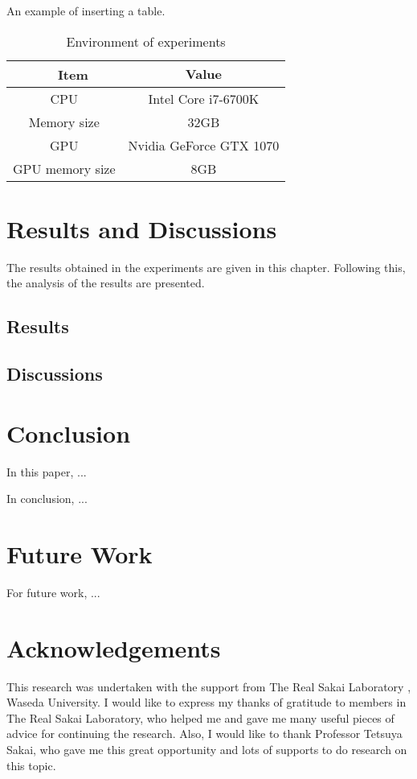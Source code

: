 \documentclass[12pt]{jsbook}
\begin{document}
An example of inserting a table.

\begin{table}[h]
  \begin{center}
    \label{environment}
    \caption{Environment of experiments}
    \begin{tabular}{c|c} \hline
      　  Item & Value \\ \hline \hline
      CPU & Intel Core i7-6700K \\
      Memory size & 32GB \\
      GPU & Nvidia GeForce GTX 1070 \\
      GPU memory size & 8GB \\ \hline
    \end{tabular}
  \end{center}
\end{table}


\chapter{\rmfamily Results and Discussions} %
\label{sec:results_and_discussions}

The results obtained in the experiments are given in this chapter. Following this, the analysis of the results are presented.

\section{Results}
\label{sub:results}

\newpage
\section{Discussions}
\label{Discussions}

\chapter{\rmfamily Conclusion} %
\label{sec:conclusion}

In this paper, ...

In conclusion, ...

\chapter{\rmfamily Future Work} %
\label{sec:future_work}

For future work, ...

\chapter*{\rmfamily Acknowledgements} %
\label{sec:acknowledgements}
This research was undertaken with the support from The Real Sakai Laboratory \cite{RSL}, Waseda University. I would like to express my thanks of gratitude to members in The Real Sakai Laboratory, who helped me and gave me many useful pieces of advice for continuing the research. Also, I would like to thank Professor Tetsuya Sakai, who gave me this great opportunity and lots of supports to do research on this topic.

\newpage




\newpage
\end{document}
